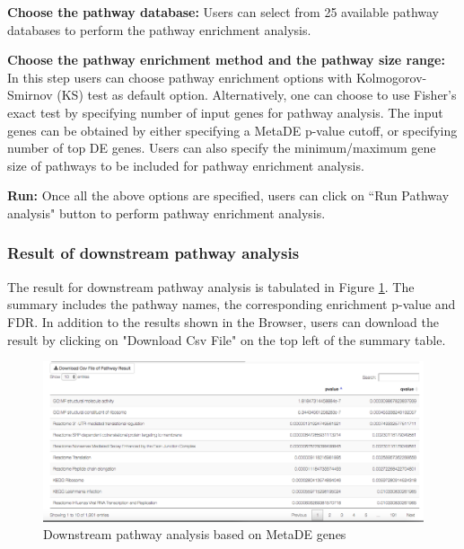 \begin{steps}
\item \textbf{Choose the pathway database:}
Users can select from 25 available pathway databases to perform the pathway enrichment analysis. 

\item \textbf{Choose the pathway enrichment method and the pathway size range:}
In this step users can choose pathway enrichment options with Kolmogorov-Smirnov (KS) test as default option.
Alternatively, one can choose to use Fisher's exact test by specifying number of input genes for pathway analysis.
The input genes can be obtained by either specifying a MetaDE p-value cutoff, or specifying number of top DE genes.
Users can also specify the minimum/maximum gene size of pathways to be included for pathway enrichment analysis.

\item \textbf{Run:}
Once all the above options are specified, users can click on ``Run Pathway analysis" button to perform pathway enrichment analysis.

\end{steps}


\subsubsection{Result of downstream pathway analysis}

The result for downstream pathway analysis  is tabulated in Figure \ref{fig:MetaDEresult2}. 
The summary includes the pathway names, the corresponding enrichment p-value and FDR. 
In addition to the results shown in the Browser, 
users can download the result by clicking on "Download Csv File" on the top left of the summary table. 

\begin{figure}[H]
\begin{center}
\includegraphics[scale=0.3]{./figure/metaDE/MetaDE_pathway.png}
\caption{Downstream pathway analysis based on MetaDE genes}
\label{fig:MetaDEresult2}
\end{center}
\end{figure}


